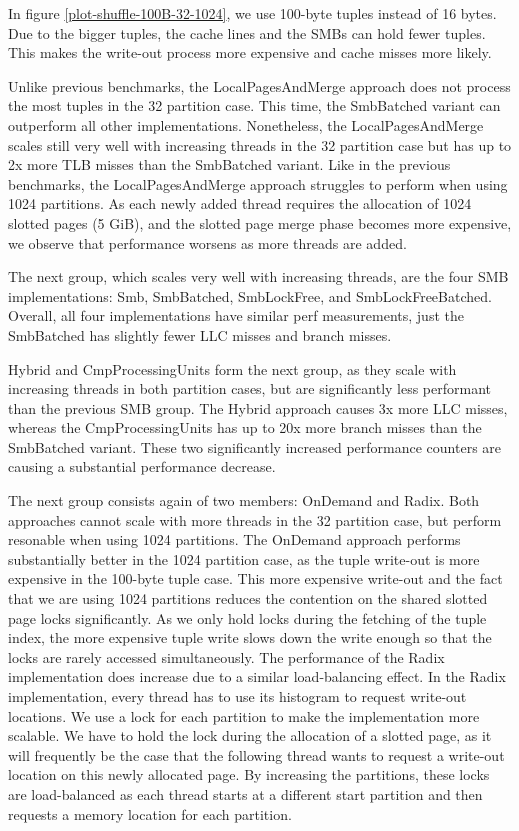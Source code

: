 In figure \ref{plot-shuffle-100B-32-1024}, we use 100-byte tuples instead of 16 bytes.
Due to the bigger tuples, the cache lines and the \acp{SMB} can hold fewer tuples.
This makes the write-out process more expensive and cache misses more likely.

Unlike previous benchmarks, the Local\-Pages\-And\-Merge approach does not process the most tuples in the 32 partition case.
This time, the Smb\-Batched variant can outperform all other implementations.
Nonetheless, the Local\-Pages\-And\-Merge scales still very well with increasing threads in the 32 partition case but has up to 2x more \ac{TLB} misses than the Smb\-Batched variant.
Like in the previous benchmarks, the Local\-Pages\-And\-Merge approach struggles to perform when using 1024 partitions.
As each newly added thread requires the allocation of 1024 slotted pages (5 GiB), and the slotted page merge phase becomes more expensive, we observe that performance worsens as more threads are added.

The next group, which scales very well with increasing threads, are the four \ac{SMB} implementations: Smb, Smb\-Batched, Smb\-Lock\-Free, and Smb\-Lock\-Free\-Batched.
Overall, all four implementations have similar perf measurements, just the Smb\-Batched has slightly fewer \ac{LLC} misses and branch misses.

Hybrid and CmpProcessingUnits form the next group, as they scale with increasing threads in both partition cases, but are significantly less performant than the previous \ac{SMB} group.
The Hybrid approach causes 3x more \ac{LLC} misses, whereas the CmpProcessingUnits has up to 20x more branch misses than the Smb\-Batched variant.
These two significantly increased performance counters are causing a substantial performance decrease.

The next group consists again of two members: OnDemand and Radix.
Both approaches cannot scale with more threads in the 32 partition case, but perform resonable when using 1024 partitions.
The OnDemand approach performs substantially better in the 1024 partition case, as the tuple write-out is more expensive in the 100-byte tuple case.
This more expensive write-out and the fact that we are using 1024 partitions reduces the contention on the shared slotted page locks significantly.
As we only hold locks during the fetching of the tuple index, the more expensive tuple write slows down the write enough so that the locks are rarely accessed simultaneously.
The performance of the Radix implementation does increase due to a similar load-balancing effect.
In the Radix implementation, every thread has to use its histogram to request write-out locations.
We use a lock for each partition to make the implementation more scalable.
We have to hold the lock during the allocation of a slotted page, as it will frequently be the case that the following thread wants to request a write-out location on this newly allocated page.
By increasing the partitions, these locks are load-balanced as each thread starts at a different start partition and then requests a memory location for each partition.

